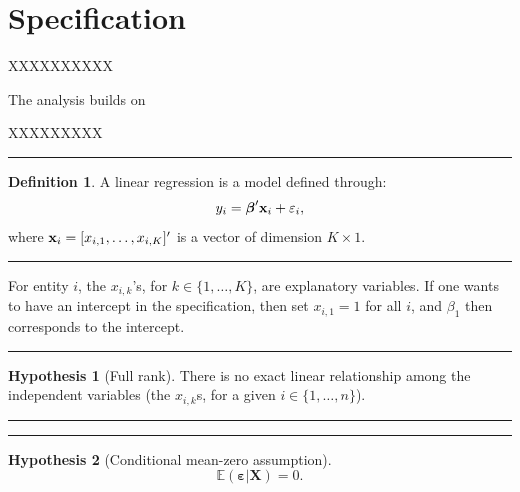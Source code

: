 \documentclass[
]{book}
\theoremstyle{definition}
\newtheorem{definition}{Definition}[chapter]
\theoremstyle{definition}
\theoremstyle{definition}
\theoremstyle{definition}
\newtheorem{hypothesis}{Hypothesis}[chapter]
\theoremstyle{remark}
\begin{document}
\hypertarget{specification}{%
\section{Specification}\label{specification}}

XXXXXXXXXX

The analysis builds on \citet{dungey2009extending}

XXXXXXXXX

\begin{center}\rule{0.5\linewidth}{0.5pt}\end{center}

\begin{definition}
\protect\hypertarget{def:essai}{}\label{def:essai}A linear regression is a model defined through:
\[
y_i = \boldsymbol\beta'{\bf x}_{i} + \varepsilon_i,
\]
where \({\bf x}_{i}=[x_{i,1},\dots,x_{i,K}]'\) is a vector of dimension \(K \times 1\).
\end{definition}

\begin{center}\rule{0.5\linewidth}{0.5pt}\end{center}

For entity \(i\), the \(x_{i,k}\)'s, for \(k \in \{1,\dots,K\}\), are explanatory variables. If one wants to have an intercept in the specification, then set \(x_{i,1}=1\) for all \(i\), and \(\beta_1\) then corresponds to the intercept.

\begin{center}\rule{0.5\linewidth}{0.5pt}\end{center}

\begin{hypothesis}[Full rank]
\protect\hypertarget{hyp:fullrank}{}\label{hyp:fullrank}There is no exact linear relationship among the independent variables (the \(x_{i,k}\)s, for a given \(i \in \{1,\dots,n\}\)).
\end{hypothesis}

\begin{center}\rule{0.5\linewidth}{0.5pt}\end{center}

\begin{center}\rule{0.5\linewidth}{0.5pt}\end{center}

\begin{hypothesis}[Conditional mean-zero assumption]
\protect\hypertarget{hyp:exogeneity}{}\label{hyp:exogeneity}\begin{equation}
\mathbb{E}(\boldsymbol\varepsilon|\mathbf{X}) = 0.
\end{equation}
\end{hypothesis}
\end{document}
